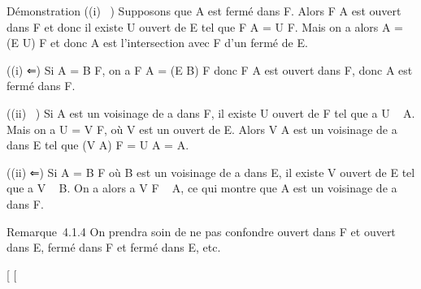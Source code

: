 \documentclass[]{article}
\begin{document}
Démonstration ((i) \rigtharrow~) Supposons que A est fermé dans F. Alors F \diagdown A est
ouvert dans F et donc il existe U ouvert de E tel que F \diagdown A = U \bigcap F.
Mais on a alors A = (E \diagdown U) \bigcap F et donc A est l'intersection avec F d'un
fermé de E.

((i) ⇐) Si A = B \bigcap F, on a F \diagdown A = (E \diagdown B) \bigcap F donc F \diagdown A est ouvert
dans F, donc A est fermé dans F.

((ii) \rigtharrow~) Si A est un voisinage de a dans F, il existe U ouvert de F tel
que a \in U \subset~ A. Mais on a U = V \bigcap F, où V est un ouvert de E. Alors V \cup A
est un voisinage de a dans E tel que (V \cup A) \bigcap F = U \cup A = A.

((ii) ⇐) Si A = B \bigcap F où B est un voisinage de a dans E, il existe V
ouvert de E tel que a \in V \subset~ B. On a alors a \in V \bigcap F \subset~ A, ce qui montre
que A est un voisinage de a dans F.

Remarque~4.1.4 On prendra soin de ne pas confondre ouvert dans F et
ouvert dans E, fermé dans F et fermé dans E, etc.

{[}
{[}
\end{document}
